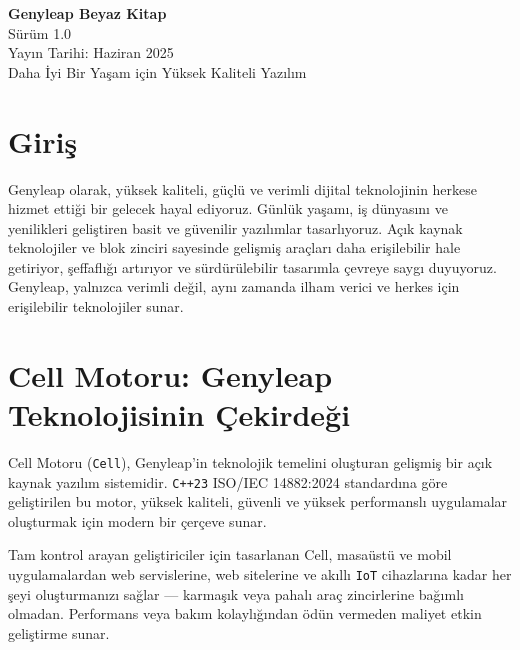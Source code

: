 \documentclass[a4paper,12pt,openany]{book}
\begin{document}
\begin{titlepage}
    \begin{center}
        \vspace*{1.5cm}
        {\Huge \textbf{Genyleap Beyaz Kitap}} \\
        \vspace{0.5cm}
        {\Large Sürüm 1.0} \\
        \vspace{0.5cm}
        {\large Yayın Tarihi: Haziran 2025} \\
        \vspace{1.5cm}
        {\large Daha İyi Bir Yaşam için Yüksek Kaliteli Yazılım} \\
    \end{center}
    \vfill
\end{titlepage}

\chapter{Giriş}
Genyleap olarak, yüksek kaliteli, güçlü ve verimli dijital teknolojinin herkese hizmet ettiği bir gelecek hayal ediyoruz. Günlük yaşamı, iş dünyasını ve yenilikleri geliştiren basit ve güvenilir yazılımlar tasarlıyoruz. Açık kaynak teknolojiler ve blok zinciri sayesinde gelişmiş araçları daha erişilebilir hale getiriyor, şeffaflığı artırıyor ve sürdürülebilir tasarımla çevreye saygı duyuyoruz. Genyleap, yalnızca verimli değil, aynı zamanda ilham verici ve herkes için erişilebilir teknolojiler sunar.

\chapter{Cell Motoru: Genyleap Teknolojisinin Çekirdeği}

Cell Motoru (\texttt{Cell}), Genyleap'in teknolojik temelini oluşturan gelişmiş bir açık kaynak yazılım sistemidir. \texttt{C++23} ISO/IEC 14882:2024 standardına göre geliştirilen bu motor, yüksek kaliteli, güvenli ve yüksek performanslı uygulamalar oluşturmak için modern bir çerçeve sunar.

Tam kontrol arayan geliştiriciler için tasarlanan Cell, masaüstü ve mobil uygulamalardan web servislerine, web sitelerine ve akıllı \texttt{IoT} cihazlarına kadar her şeyi oluşturmanızı sağlar — karmaşık veya pahalı araç zincirlerine bağımlı olmadan. Performans veya bakım kolaylığından ödün vermeden maliyet etkin geliştirme sunar.
\end{document}
